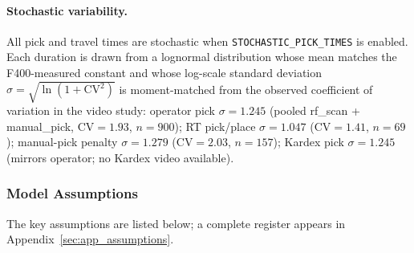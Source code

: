 \paragraph{Stochastic variability.}
All pick and travel times are stochastic when \texttt{STOCHASTIC\_PICK\_TIMES}
is enabled. Each duration is drawn from a lognormal distribution whose mean
matches the F400-measured constant and whose log-scale standard deviation
$\sigma = \sqrt{\ln(1 + \mathrm{CV}^2)}$ is moment-matched from the observed
coefficient of variation in the video study: operator pick $\sigma = 1.245$
(pooled rf\_scan + manual\_pick, $\mathrm{CV} = 1.93$, $n = 900$); RT
pick/place $\sigma = 1.047$ ($\mathrm{CV} = 1.41$, $n = 69$); manual-pick
penalty $\sigma = 1.279$ ($\mathrm{CV} = 2.03$, $n = 157$); Kardex pick
$\sigma = 1.245$ (mirrors operator; no Kardex video available).

\subsubsection{Model Assumptions}\label{sec:assumptions_condensed}

The key assumptions are listed below; a complete register appears in
Appendix~\ref{sec:app_assumptions}.

